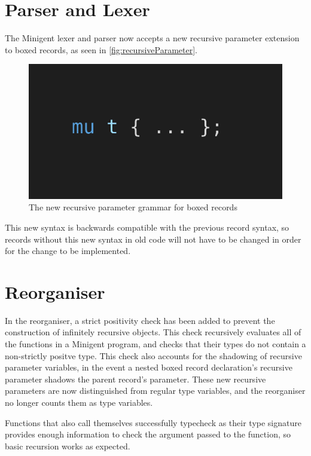 \section{Parser and Lexer}

The Minigent lexer and parser now accepts a new recursive parameter extension to boxed records,
as seen in \autoref{fig:recursiveParameter}.

\begin{figure}
    \centering
    \includegraphics[width=0.5\linewidth]{content/recursive_parameter.png}
    \caption{The new recursive parameter grammar for boxed records}
    \label{fig:recursiveParameter}
\end{figure}

This new syntax is backwards compatible with the previous record syntax, so records without this new
syntax in old code will not have to be changed in order for the change to be implemented.


\section{Reorganiser}

In the reorganiser, a strict positivity check has been added to prevent the construction of infinitely
recursive objects. This check recursively evaluates all of the functions in a Minigent program, and
checks that their types do not contain a non-strictly positve type. This check also accounts for the
shadowing of recursive parameter variables, in the event a nested boxed record declaration's recursive
parameter shadows the parent record's parameter. These new recursive parameters are now distinguished from
regular type variables, and the reorganiser no longer counts them as type variables.

Functions that also call themselves successfully typecheck as their type signature provides enough information
to check the argument passed to the function, so basic recursion works as expected.


